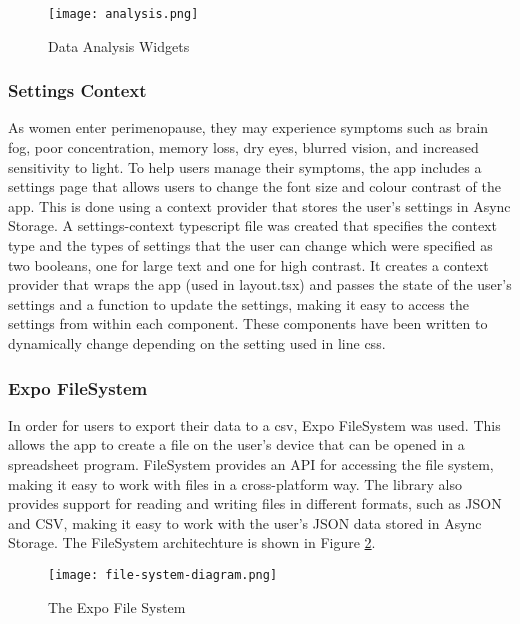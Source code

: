 \begin{figure}[h!!]
  \begin{center}
    \texttt{[image: analysis.png]}
    \caption{Data Analysis Widgets}
    \label{figure:analysis}
  \end{center}
\end{figure}

\subsubsection{Settings Context}
As women enter perimenopause, they may experience symptoms such as brain fog, poor concentration, memory loss, dry eyes, blurred vision, and increased sensitivity to light\cite{KellyDonel2023}. To help users manage their symptoms, the app includes a settings page that allows users to change the font size and colour contrast of the app. This is done using a context provider that stores the user's settings in Async Storage. A settings-context typescript file was created that specifies the context type and the types of settings that the user can change which were specified as two booleans, one for large text and one for high contrast. It creates a context provider that wraps the app (used in layout.tsx) and passes the state of the user's settings and a function to update the settings, making it easy to access the settings from within each component. These components have been written to dynamically change depending on the setting used in line css. 

\subsubsection{Expo FileSystem}
In order for users to export their data to a csv, Expo FileSystem was used. This allows the app to create a file on the user's device that can be opened in a spreadsheet program. FileSystem provides an API for accessing the file system, making it easy to work with files in a cross-platform way. The library also provides support for reading and writing files in different formats, such as JSON and CSV, making it easy to work with the user's JSON data stored in Async Storage. The FileSystem architechture is shown in Figure \ref{figure:file-system-diagram}.

\begin{figure}[h!!]
    \begin{center}
      \texttt{[image: file-system-diagram.png]}
      \caption{The Expo File System\cite{ExpoFileSystem2025}}
      \label{figure:file-system-diagram}
    \end{center}
  \end{figure}

